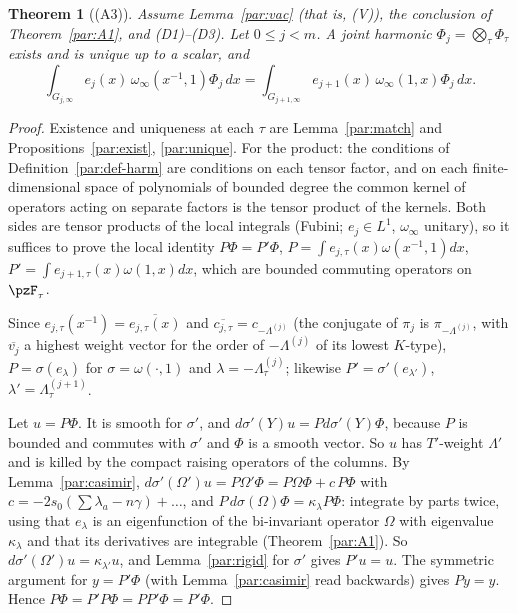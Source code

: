 \documentclass[10pt]{amsart}
\newtheorem{theorem}{Theorem}[section]
\theoremstyle{definition}
\theoremstyle{remark}
\begin{document}
\begin{theorem}[(A3)]\label{par:A3}
Assume Lemma~\ref{par:vac} (that is, (V)), the conclusion of Theorem~\ref{par:A1}, and
\textup{(D1)--(D3)}. Let $0\le j<m$. A joint harmonic $\Phi_j=\bigotimes_\tau\Phi_\tau$ exists and is
unique up to a scalar, and
\[
\int_{G_{j,\infty}}e_j(x)\,\omega_\infty(x^{-1},1)\Phi_j\,dx=\int_{G_{j+1,\infty}}e_{j+1}(x)\,\omega_\infty(1,x)
\Phi_j\,dx .
\]
\end{theorem}
\begin{proof}
Existence and uniqueness at each $\tau$ are Lemma~\ref{par:match} and
Propositions~\ref{par:exist}, \ref{par:unique}. For the product: the conditions of
Definition~\ref{par:def-harm} are conditions on each tensor factor, and on each finite-dimensional
space of polynomials of bounded degree the common kernel of operators acting on separate factors is
the tensor product of the kernels. Both sides are tensor products of the local integrals (Fubini;
$e_j\in L^1$, $\omega_\infty$ unitary), so it suffices to prove the local identity
$P\Phi=P'\Phi$, $P=\int e_{j,\tau}(x)\omega(x^{-1},1)dx$, $P'=\int e_{j+1,\tau}(x)\omega(1,x)dx$, which
are bounded commuting operators on $\pzF_\tau$.

Since $e_{j,\tau}(x^{-1})=\overline{e_{j,\tau}(x)}$ and $\overline{c_{j,\tau}}=c_{-\Lambda^{(j)}}$ (the
conjugate of $\pi_j$ is $\pi_{-\Lambda^{(j)}}$, with $\overline{v_j}$ a highest weight vector for the
order of $-\Lambda^{(j)}$ of its lowest $K$-type), $P=\sigma(e_\lambda)$ for $\sigma=\omega(\cdot,1)$ and
$\lambda=-\Lambda^{(j)}_\tau$; likewise $P'=\sigma'(e_{\lambda'})$, $\lambda'=\Lambda^{(j+1)}_\tau$.

Let $u=P\Phi$. It is smooth for $\sigma'$, and $d\sigma'(Y)u=Pd\sigma'(Y)\Phi$, because $P$ is
bounded and commutes with $\sigma'$ and $\Phi$ is a smooth vector. So $u$ has $T'$-weight $\Lambda'$
and is killed by the compact raising operators of the columns. By Lemma~\ref{par:casimir},
$d\sigma'(\Omega')u=P\Omega'\Phi=P\Omega\Phi+c\,P\Phi$ with $c=-2s_0(\sum\lambda_a-n\gamma)+\dots$, and
$P\,d\sigma(\Omega)\Phi=\kappa_\lambda P\Phi$: integrate by parts twice, using that $e_\lambda$ is an
eigenfunction of the bi-invariant operator $\Omega$ with eigenvalue $\kappa_\lambda$ and that its
derivatives are integrable (Theorem~\ref{par:A1}). So $d\sigma'(\Omega')u=\kappa_{\lambda'}u$, and
Lemma~\ref{par:rigid} for $\sigma'$ gives $P'u=u$. The symmetric argument for $y=P'\Phi$ (with
Lemma~\ref{par:casimir} read backwards) gives $Py=y$. Hence $P\Phi=P'P\Phi=PP'\Phi=P'\Phi$.
\end{proof}
\end{document}
